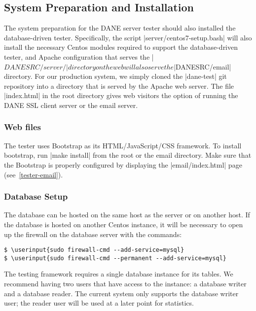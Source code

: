 \documentclass[preprint,3p,11pt]{elsarticle}
\newcommand\userinput[1]{\textbf{#1}}
\begin{document}
\subsection{System Preparation and Installation}
The system preparation for the DANE server tester should also
installed the database-driven tester. Specifically, the script |server/centos7-setup.bash| will also install the necessary
Centos modules required to support the database-driven tester, and
Apache configuration that serves the |$DANESRC/server/| directory on
the web will also serve the |$DANESRC/email| directory. For our
production system, we simply cloned the |dane-test| git repository
into a directory that is served by the Apache web server. The file
|index.html| in the root directory gives web visitors the option of
running the DANE SSL client server or the email server. 

\subsubsection{Web files}

The tester uses Bootstrap as its HTML/JavaScript/CSS framework. To
install bootstrap, run |make install| from the root or the email directory. Make
sure that the Bootstrap is properly configured by displaying the
|email/index.html| page (see~\ref{tester-email}).


\subsubsection{Database Setup}

The database can be hosted on the same host as the server or on
another host. If the database is hosted on another Centos instance,
it will be necessary to open up the firewall on the database server
with the commands:

\begin{Verbatim}[commandchars=\\\{\}]
$ \userinput{sudo firewall-cmd --add-service=mysql}
$ \userinput{sudo firewall-cmd --permanent --add-service=mysql}
\end{Verbatim}

The testing framework requires a single database instance for its
tables. We recommend having two users that have access to the
instance: a database writer and a database reader. The current system
only supports the database writer user; the reader user will be used
at a later point for statistics.
\end{document}
